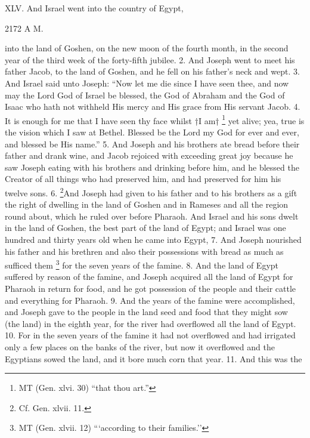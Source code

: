 
XLV. And Israel went into the country of Egypt,

2172 A M.

into the land of Goshen, on the new moon of the fourth month, in the second year of the third week of the forty-fifth jubilee. 2. And Joseph went to meet his father Jacob, to the land of Goshen, and he fell on his father's neck and wept. 3. And Israel said unto Joseph: ``Now let me die since I have seen thee, and now may the Lord God of Israel be blessed, the God of Abraham and the God of Isaac who hath not withheld His mercy and His grace from His servant Jacob. 4. It is enough for me that I have seen thy face whilst †I am† \footnote{MT (Gen. xlvi. 30) ``that thou art.''} yet alive; yea, true is the vision which I saw at Bethel. Blessed be the Lord my God for ever and ever, and blessed be His name.'' 5. And Joseph and his brothers ate bread before their father and drank wine, and Jacob rejoiced with exceeding great joy because he saw Joseph eating with his brothers and drinking before him, and he blessed the Creator of all things who had preserved him, and had preserved for him his twelve sons. 6. \footnote{Cf. Gen. xlvii. 11.}And Joseph had given to his father and to his brothers as a gift the right of dwelling in the land of Goshen and in Rameses and all the region round about, which he ruled over before Pharaoh. And Israel and his sons dwelt in the land of Goshen, the best part of the land of Egypt; and Israel was one hundred and thirty years old when he came into Egypt, 7. And Joseph nourished his father and his brethren and also their possessions with bread as much as sufficed them \footnote{MT (Gen. xlvii. 12) ```according to their families.''} for the seven years of the famine. 8. And the land of Egypt suffered by reason of the famine, and Joseph acquired all the land of Egypt for Pharaoh in return for food, and he got possession of the people and their cattle and everything for Pharaoh. 9. And the years of the famine were accomplished, and Joseph gave to the people in the land seed and food that they might sow (the land) in the eighth year, for the river had overflowed all the land of Egypt. 10. For in the seven years of the famine it had not overflowed and had irrigated only a few places on the banks of the river, but now it overflowed and the Egyptians sowed the land, and it bore much corn that year. 11. And this was the

